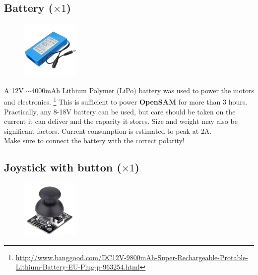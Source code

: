 \subsection{Battery ($\times1$)}

\begin{figure}
    \vspace{-1.5cm}
    \includegraphics[width=0.25\textwidth]{ThirdParts/Battery.PNG}
\end{figure}

A 12V $\sim$4000mAh Lithium Polymer (LiPo) battery was used to power the motors and electronics. \footnote{\url{http://www.banggood.com/DC12V-9800mAh-Super-Rechargeable-Protable-Lithium-Battery-EU-Plug-p-963254.html}} This is sufficient to power \textbf{\textsf{OpenSAM}} for more than 3 hours.\\

\raisebox{-0.2cm}{\hspace{-1.5cm}\Huge\Info}\normalsize \quad Practically, any 8-18V battery can be used, but care should be taken on the current it can deliver and the capacity it stores. Size and weight may also be significant factors. Current consumption is estimated to peak at 2A.\\

\raisebox{-0.2cm}{\hspace{-1.5cm}\Huge\Radioactivity}\normalsize \quad Make sure to connect the battery with the correct polarity!\\


\subsection{Joystick with button ($\times1$)}

\begin{figure}
    \vspace{0.1cm}
    \includegraphics[width=0.25\textwidth]{ThirdParts/Joystick.PNG}
\end{figure}


